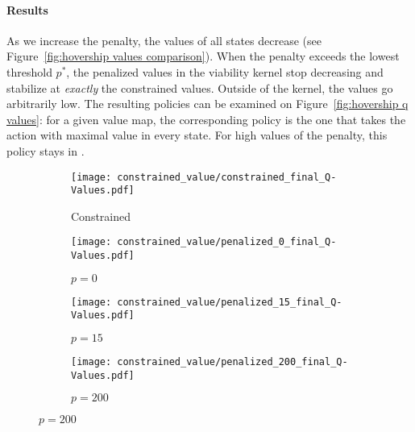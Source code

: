 \paragraph{Results} As we increase the penalty, the values of all states decrease (see Figure~\ref{fig:hovership values comparison}). When the penalty exceeds the lowest threshold $p^*$, the penalized values in the viability kernel stop decreasing and stabilize at\emph{ exactly} the constrained values. Outside of the kernel, the values go arbitrarily low. The resulting policies can be examined on Figure~\ref{fig:hovership q values}: for a given value map, the corresponding policy is the one that takes the action with maximal value in every state. For high values of the penalty, this policy stays in \QV.
\begin{figure}[!htb]
	\centering
	\begin{subfigure}{0.45\textwidth}
		\centering
		\texttt{[image: constrained\_value/constrained\_final\_Q-Values.pdf]}
		\caption{Constrained}
		\label{fig:hovership q values:constrained}
	\end{subfigure}
	\begin{subfigure}{0.45\textwidth}
		\centering
		\texttt{[image: constrained\_value/penalized\_0\_final\_Q-Values.pdf]}
		\caption{$p=0$}
		\label{fig:hovership q values:0}
	\end{subfigure}
	\newline
	\begin{subfigure}{0.45\textwidth}
		\centering
		\texttt{[image: constrained\_value/penalized\_15\_final\_Q-Values.pdf]}
		\caption{$p=15$}
		\label{fig:hovership q values:15}
	\end{subfigure}
	\begin{subfigure}{0.45\textwidth}
		\centering
		\texttt{[image: constrained\_value/penalized\_200\_final\_Q-Values.pdf]}
		\caption{$p=200$}
		\label{fig:hovership q values:200}
	\end{subfigure}

\end{figure}
